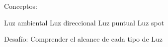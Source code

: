 Conceptos:

Luz ambiental
Luz direccional
Luz puntual
Luz spot

Desafío:
Comprender el alcance de cada tipo de Luz

